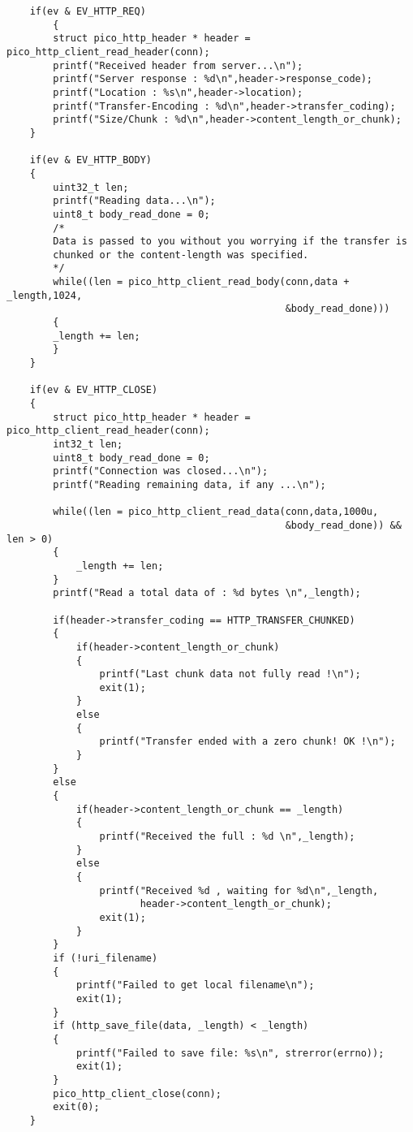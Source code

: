 \begin{verbatim}
    if(ev & EV_HTTP_REQ)
        {
        struct pico_http_header * header = pico_http_client_read_header(conn);
        printf("Received header from server...\n");
        printf("Server response : %d\n",header->response_code);
        printf("Location : %s\n",header->location);
        printf("Transfer-Encoding : %d\n",header->transfer_coding);
        printf("Size/Chunk : %d\n",header->content_length_or_chunk);
    }

    if(ev & EV_HTTP_BODY)
    {
        uint32_t len;
        printf("Reading data...\n");
        uint8_t body_read_done = 0;
        /*
        Data is passed to you without you worrying if the transfer is
        chunked or the content-length was specified.
        */
        while((len = pico_http_client_read_body(conn,data + _length,1024,
                                                &body_read_done)))
        {
        _length += len;
        }
    }

    if(ev & EV_HTTP_CLOSE)
    {
        struct pico_http_header * header = pico_http_client_read_header(conn);
        int32_t len;
        uint8_t body_read_done = 0;
        printf("Connection was closed...\n");
        printf("Reading remaining data, if any ...\n");

        while((len = pico_http_client_read_data(conn,data,1000u,
                                                &body_read_done)) && len > 0)
        {
            _length += len;
        }
        printf("Read a total data of : %d bytes \n",_length);

        if(header->transfer_coding == HTTP_TRANSFER_CHUNKED)
        {
            if(header->content_length_or_chunk)
            {
                printf("Last chunk data not fully read !\n");
                exit(1);
            }
            else
            {
                printf("Transfer ended with a zero chunk! OK !\n");
            }
        }
        else
        {
            if(header->content_length_or_chunk == _length)
            {
                printf("Received the full : %d \n",_length);
            }
            else
            {
                printf("Received %d , waiting for %d\n",_length,
                       header->content_length_or_chunk);
                exit(1);
            }
        }
        if (!uri_filename)
        {
            printf("Failed to get local filename\n");
            exit(1);
        }
        if (http_save_file(data, _length) < _length)
        {
            printf("Failed to save file: %s\n", strerror(errno));
            exit(1);
        }
        pico_http_client_close(conn);
        exit(0);
    }


\end{verbatim}
